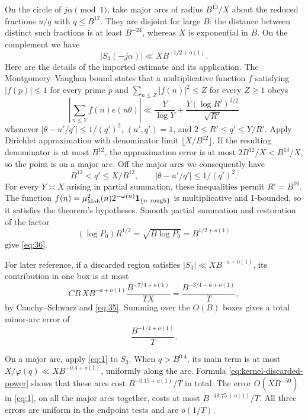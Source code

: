 On the circle of \(j\alpha\pmod1\), take major arcs of radius
\(B^{13}/X\) about the reduced fractions \(u/q\) with
\(q\le B^{12}\).  They are disjoint for large \(B\): the distance
between distinct such fractions is at least \(B^{-24}\), whereas
\(X\) is exponential in \(B\).  On the complement we have
\begin{equation}\label{eq:36}
 |S_3(-j\alpha)|\ll X B^{-1/2+o(1)}.
\end{equation}
Here are the details of the imported estimate and its application.
The Montgomery--Vaughan bound \cite[Corollary~1]{MontgomeryVaughan1977}
states that a multiplicative function \(f\) satisfying
\(\lvert f(p)\rvert\le1\) for every prime \(p\) and
\(\sum_{n\le Z}|f(n)|^2\le Z\) for every \(Z\ge1\) obeys
\[
 \left|\sum_{n\le Y}f(n)e(n\theta)\right|
 \ll \frac{Y}{\log Y}
       +\frac{Y(\log R')^{3/2}}{\sqrt{R'}}
\]
whenever \(\lvert\theta-u'/q'\rvert\le1/(q')^2\),
\((u',q')=1\), and \(2\le R'\le q'\le Y/R'\).
Apply Dirichlet approximation with denominator limit
\(\lfloor X/B^{12}\rfloor\).  If the resulting denominator is at most
\(B^{12}\), the approximation error is at most
\(2B^{12}/X<B^{13}/X\), so the point is on a major arc.  Off the
major arcs we consequently have
\[
 B^{12}<q'\le X/B^{12},\qquad
 |\theta-u'/q'|\le1/(q')^2.
\]
For every \(Y\asymp X\) arising in partial summation, these inequalities
permit \(R'=B^{10}\).  The function
\(f(n)=\mu_{\rm Mob}^2(n)2^{-\omega(n)}\mathbf 1_{\{n\ {\rm rough}\}}\)
is multiplicative and 1-bounded, so it satisfies the theorem's
hypotheses.  Smooth partial summation and restoration of the factor
\[
 (\log P_0)R^{1/2}=\sqrt{B\log P_0}=B^{1/2+o(1)}
\]
give \eqref{eq:36}.

For later reference, if a discarded region satisfies
\(\lvert S_3\rvert\ll XB^{-a+o(1)}\), its contribution in one box is
at most
\begin{equation}\label{eq:kernel-discarded-power}
 C B\,XB^{-a+o(1)}
       \frac{B^{-7/4+o(1)}}{TX}
 =\frac{B^{-3/4-a+o(1)}}{T},
\end{equation}
by Cauchy--Schwarz and \eqref{eq:35}.  Summing over the \(O(B)\) boxes
gives a total minor-arc error of
\[
 \frac{B^{-1/4+o(1)}}{T}.
\]

On a major arc, apply \eqref{eq:1} to \(S_3\).  When
\(q>B^{0.4}\), its main term is at most
\(X/\varphi(q)\ll XB^{-0.4+o(1)}\), uniformly along the arc.
Formula \eqref{eq:kernel-discarded-power} shows that these arcs cost
\(B^{-0.15+o(1)}/T\) in total.  The error \(O(XB^{-50})\) in
\eqref{eq:1}, on all the major arcs together, costs at most
\(B^{-49.75+o(1)}/T\).  All three errors are uniform in the endpoint
tests and are \(o(1/T)\).

